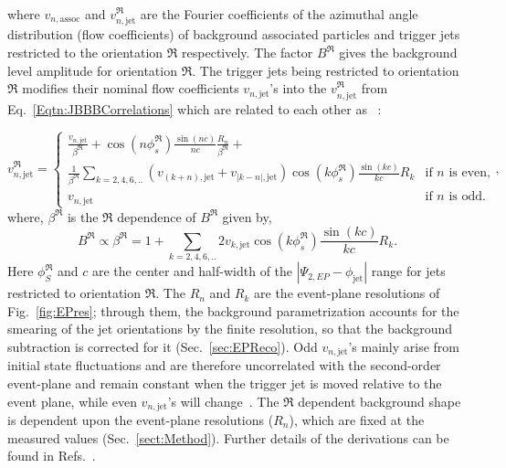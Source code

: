 \noindent where $v_{n,\mathrm{assoc}}$ and $v^\mathfrak{R}_{n, \mathrm{jet}}$ are the Fourier coefficients of the azimuthal angle distribution (flow coefficients) of background associated particles and trigger jets restricted to the orientation $\mathfrak{R}$ respectively. The factor $B^\mathfrak{R}$ gives the background level amplitude for orientation $\mathfrak{R}$. The trigger jets being restricted to orientation $\mathfrak{R}$ modifies their nominal flow coefficients $v_{n, \mathrm{jet}}$'s into the $v^\mathfrak{R}_{n, \mathrm{jet}}$ from Eq.~\ref{Eqtn:JBBBCorrelations} which are related to each other as ~\cite{Bielcikova:2003ku}:

\begin{equation}
	v^{\mathfrak{R}}_{n, \mathrm{jet}} = 
	\begin{cases}
		\frac{v_{n, \mathrm{jet}}}{\beta^\mathfrak{R}}+ \cos(n\phi_{s}^\mathfrak{R}) \frac{\sin(nc)}{nc}\frac{R_{n}}{\beta^\mathfrak{R}} + &\\
		\frac{1}{\beta^\mathfrak{R}}\sum_{k=2,4,6,..} (v_{(k+n), \mathrm{jet}}+v_{|k-n|, \mathrm{jet}})
		\cos(k\phi_{s}^\mathfrak{R}) \frac{\sin(kc)}{kc}R_{k} & \text{if $n$ is even,}\\
		v_{n, \mathrm{jet}} & \text{if $n$ is odd.}
	\end{cases},
	\label{Eq:vRn}
\end{equation}
where, $\beta^\mathfrak{R}$ is the $\mathfrak{R}$ dependence of $B^\mathfrak{R}$ given by,
\begin{equation}
	B^\mathfrak{R} \propto \beta^\mathfrak{R} = 1 + \sum_{k=2,4,6,..} 2v_{k, \mathrm{jet}} \cos(k\phi_{s}^\mathfrak{R}) \frac{\sin(kc)}{kc}R_{k}.
	\label{Eq:betaR}
\end{equation}
Here $\phi_S^\mathfrak{R}$ and $c$ are the center and half-width of the $|\Psi_{2,EP}-\phi_{\mathrm {jet}}|$ range for jets restricted to orientation $\mathfrak{R}$. The \(R_n\) and \(R_k\) are the event-plane resolutions of Fig.~\ref{fig:EPres}; through them, the background parametrization accounts for the smearing of the jet orientations by the finite resolution, so that the background subtraction is corrected for it (Sec.~\ref{sec:EPReco}). Odd $v_{n, \mathrm{jet}}$'s mainly arise from initial state fluctuations and are therefore uncorrelated with the second-order event-plane and remain constant when the trigger jet is moved relative to the event plane, while even $v_{n, \mathrm{jet}}$'s will change~\cite{Aad:2014fla,Sharma:2015qra}. The $\mathfrak{R}$ dependent background shape is dependent upon the event-plane resolutions ($R_{n}$), which are fixed at the measured values (Sec.~\ref{sect:Method}). Further details of the derivations can be found in Refs.~\cite{Bielcikova:2003ku,Nattrass_2018,Nattrass_Reexam2018}. 

